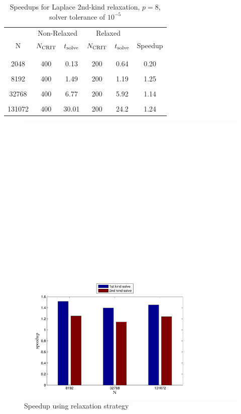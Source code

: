 \begin{table}[h]
\begin{center}
\begin{tabular}{c|cc|cc|c}
  & \multicolumn{2}{c|}{Non-Relaxed} & \multicolumn{2}{c|}{Relaxed} & \\
  N & $N_{\text{CRIT}}$ & $t_{\text{solve}}$ & $N_{\text{CRIT}}$ & $t_{\text{solve}}$ & Speedup \\
   & & & & & \\ \hline
   & & & & & \\
  2048 & 400 & 0.13 & 200 & 0.64 & 0.20 \\
   & & & & & \\
  8192 & 400 & 1.49 & 200 & 1.19 & 1.25 \\
   & & & & & \\
  32768 & 400 & 6.77 & 200 & 5.92 & 1.14 \\
   & & & & & \\
  131072 & 400 & 30.01 & 200 & 24.2 & 1.24 \\
 
\end{tabular}
\end{center}
\caption{Speedups for Laplace 2nd-kind relaxation, $p=8$, solver tolerance of $10^{-5}$}
\label{tab:laplace_2nd_relaxation}
\end{table}%

\begin{figure}[h]
	\centering
	\includegraphics[width=14cm]{img/relaxation_timing_bar.pdf}
	\caption{Speedup using relaxation strategy}
	\label{fig:relaxation_timing}
\end{figure}

